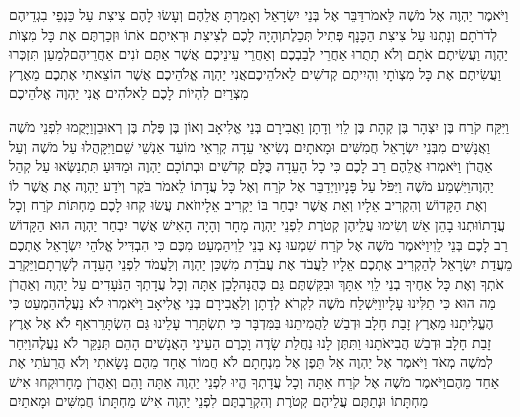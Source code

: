 \documentclass[../main/main.tex]{subfiles}
\begin{document}
\begin{multicols}{\ncols}
וַיֹּאמֶר יַהְוֶה אֶל מֹשֶׁה לֵּאמֹר\PreVerseSpace{}דַּבֵּר אֶל בְּנֵי יִשְׂרָאֵל וְאָמַרְתָּ אֲלֵהֶם וְעָשׂוּ לָהֶם צִיצִת עַל כַּנְפֵי בִגְדֵיהֶם לְדֹרֹתָם וְנָתְנוּ עַל צִיצִת הַכָּנָף פְּתִיל תְּכֵלֶת\PreVerseSpace{}וְהָיָה לָכֶם לְצִיצִת וּרְאִיתֶם אֹתוֹ וּזְכַרְתֶּם אֶת כָּל מִצְוֺת יַהְוֶה וַעֲשִׂיתֶם אֹתָם וְלֹא תָתֻרוּ אַחֲרֵי לְבַבְכֶם וְאַחֲרֵי עֵינֵיכֶם אֲשֶׁר אַתֶּם זֹנִים אַחֲרֵיהֶם\PreVerseSpace{}לְמַעַן תִּזְכְּרוּ וַעֲשִׂיתֶם אֶת כָּל מִצְוֺתָי וִהְיִיתֶם קְדֹשִׁים לֵאלֹהֵיכֶם\PreVerseSpace{}אֲנִי יַהְוֶה אֱלֹהֵיכֶם אֲשֶׁר הוֹצֵאתִי אֶתְכֶם מֵאֶרֶץ מִצְרַיִם לִהְיוֹת לָכֶם לֵאלֹהִים אֲנִי יַהְוֶה אֱלֹהֵיכֶם\OpenSection{}\par
{}וַיִּקַּח קֹרַח בֶּן יִצְהָר בֶּן קְהָת בֶּן לֵוִי וְדָתָן וַאֲבִירָם בְּנֵי אֱלִיאָב וְאוֹן בֶּן פֶּלֶת בֶּן\SubEnd{} רְאוּבֵן\PreVerseSpace{}וַיָּקֻמוּ לִפְנֵי מֹשֶׁה וַאֲנָשִׁים מִבְּנֵי יִשְׂרָאֵל חֲמִשִּׁים וּמָאתָיִם נְשִׂיאֵי עֵדָה קְרִאֵי מוֹעֵד אַנְשֵׁי שֵׁם\PreVerseSpace{}וַיִּקָּהֲלוּ עַל מֹשֶׁה וְעַל אַהֲרֹן וַיֹּאמְרוּ אֲלֵהֶם רַב לָכֶם כִּי כָל הָעֵדָה כֻּלָּם קְדֹשִׁים וּבְתוֹכָם יַהְוֶה וּמַדּוּעַ תִּתְנַשְּׂאוּ עַל קְהַל יַהְוֶה\PreVerseSpace{}וַיִּשְׁמַע מֹשֶׁה וַיִּפֹּל עַל פָּנָיו\PreVerseSpace{}וַיְדַבֵּר אֶל קֹרַח וְאֶל כָּל עֲדָתוֹ לֵאמֹר בֹּקֶר וְיֹדַע יַהְוֶה אֶת אֲשֶׁר לוֹ וְאֶת הַקָּדוֹשׁ וְהִקְרִיב אֵלָיו וְאֵת אֲשֶׁר יִבְחַר בּוֹ יַקְרִיב אֵלָיו\PreVerseSpace{}זֹאת עֲשׂוּ קְחוּ לָכֶם מַחְתּוֹת קֹרַח וְכָל עֲדָתוֹ\PreVerseSpace{}וּתְנוּ בָהֵן אֵשׁ וְשִׂימוּ עֲלֵיהֶן קְטֹרֶת לִפְנֵי יַהְוֶה מָחָר וְהָיָה הָאִישׁ אֲשֶׁר יִבְחַר יַהְוֶה הוּא הַקָּדוֹשׁ רַב לָכֶם בְּנֵי לֵוִי\PreVerseSpace{}וַיֹּאמֶר מֹשֶׁה אֶל קֹרַח שִׁמְעוּ נָא בְּנֵי לֵוִי\PreVerseSpace{}הַמְעַט מִכֶּם כִּי הִבְדִּיל אֱלֹהֵי יִשְׂרָאֵל אֶתְכֶם מֵעֲדַת יִשְׂרָאֵל לְהַקְרִיב אֶתְכֶם אֵלָיו לַעֲבֹד אֶת עֲבֹדַת מִשְׁכַּן יַהְוֶה וְלַעֲמֹד לִפְנֵי הָעֵדָה לְשָׁרְתָם\PreVerseSpace{}וַיַּקְרֵב אֹתְךָ וְאֶת כָּל אַחֶיךָ בְנֵי לֵוִי אִתָּךְ וּבִקַּשְׁתֶּם גַּם כְּהֻנָּה\PreVerseSpace{}לָכֵן אַתָּה וְכָל עֲדָתְךָ הַנֹּעָדִים עַל יַהְוֶה וְאַהֲרֹן מַה הוּא כִּי תַלִּינוּ\SubEnd{} עָלָיו\PreVerseSpace{}וַיִּשְׁלַח מֹשֶׁה לִקְרֹא לְדָתָן וְלַאֲבִירָם בְּנֵי אֱלִיאָב וַיֹּאמְרוּ לֹא נַעֲלֶה\PreVerseSpace{}הַמְעַט כִּי הֶעֱלִיתָנוּ מֵאֶרֶץ זָבַת חָלָב וּדְבַשׁ לַהֲמִיתֵנוּ בַּמִּדְבָּר כִּי תִשְׂתָּרֵר עָלֵינוּ גַּם הִשְׂתָּרֵר\PreVerseSpace{}אַף לֹא אֶל אֶרֶץ זָבַת חָלָב וּדְבַשׁ הֲבִיאֹתָנוּ וַתִּתֶּן לָנוּ נַחֲלַת שָׂדֶה וָכָרֶם הַעֵינֵי הָאֲנָשִׁים הָהֵם תְּנַקֵּר לֹא נַעֲלֶה\PreVerseSpace{}וַיִּחַר לְמֹשֶׁה מְאֹד וַיֹּאמֶר אֶל יַהְוֶה אַל תֵּפֶן אֶל מִנְחָתָם לֹא חֲמוֹר אֶחָד מֵהֶם נָשָׂאתִי וְלֹא הֲרֵעֹתִי אֶת אַחַד מֵהֶם\PreVerseSpace{}וַיֹּאמֶר מֹשֶׁה אֶל קֹרַח אַתָּה וְכָל עֲדָתְךָ הֱיוּ לִפְנֵי יַהְוֶה אַתָּה וָהֵם וְאַהֲרֹן מָחָר\PreVerseSpace{}וּקְחוּ אִישׁ מַחְתָּתוֹ וּנְתַתֶּם עֲלֵיהֶם קְטֹרֶת וְהִקְרַבְתֶּם לִפְנֵי יַהְוֶה אִישׁ מַחְתָּתוֹ חֲמִשִּׁים וּמָאתַיִם 
\end{multicols}
\end{document}

